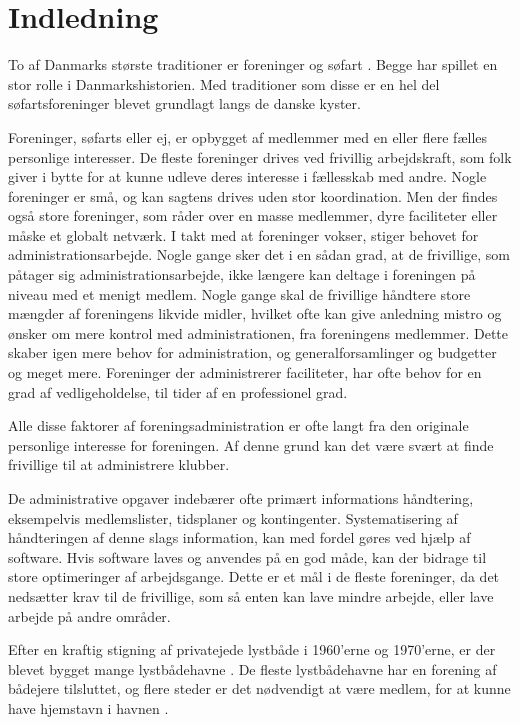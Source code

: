 \chapter{Indledning}

To af Danmarks største traditioner er foreninger og søfart \cite{moller1997}. Begge har spillet en stor rolle i Danmarkshistorien. Med traditioner som disse er en hel del søfartsforeninger blevet grundlagt langs de danske kyster. 

Foreninger, søfarts eller ej, er opbygget af medlemmer med en eller flere fælles personlige interesser. De fleste foreninger drives ved frivillig arbejdskraft, som folk giver i bytte for at kunne udleve deres interesse i fællesskab med andre. Nogle foreninger er små, og kan sagtens drives uden stor koordination. Men der findes også store foreninger, som råder over en masse medlemmer, dyre faciliteter eller måske et globalt netværk. I takt med at foreninger vokser, stiger behovet for administrationsarbejde. Nogle gange sker det i en sådan grad, at de frivillige, som påtager sig administrationsarbejde, ikke længere kan deltage i foreningen på niveau med et menigt medlem. Nogle gange skal de frivillige håndtere store mængder af foreningens likvide midler, hvilket ofte kan give anledning mistro og ønsker om mere kontrol med administrationen, fra foreningens medlemmer. Dette skaber igen mere behov for administration, og generalforsamlinger og budgetter og meget mere. Foreninger der administrerer faciliteter, har ofte behov for en grad af vedligeholdelse, til tider af en professionel grad. 

Alle disse faktorer af foreningsadministration er ofte langt fra den originale personlige interesse for foreningen. Af denne grund kan det være svært at finde frivillige til at administrere klubber.

De administrative opgaver indebærer ofte primært informations håndtering, eksempelvis medlemslister, tidsplaner og kontingenter. Systematisering af håndteringen af denne slags information, kan med fordel gøres ved hjælp af software. Hvis software laves og anvendes på en god måde, kan der bidrage til store optimeringer af arbejdsgange. Dette er et mål i de fleste foreninger, da det nedsætter krav til de frivillige, som så enten kan lave mindre arbejde, eller lave arbejde på andre områder.

Efter en kraftig stigning af privatejede lystbåde i 1960'erne og 1970'erne, er der blevet bygget mange lystbådehavne \cite{gyldendal_redaktionen_havn_2013}. De fleste lystbådehavne har en forening af bådejere tilsluttet, og flere steder er det nødvendigt at være medlem, for at kunne have hjemstavn i havnen \cite{int_vb_sl}.

